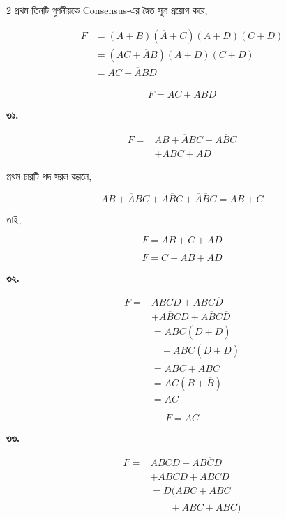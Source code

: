 \begin{multicols}{2}
প্রথম তিনটি গুণনীয়কে
\textenglish{Consensus}-এর দ্বৈত সূত্র প্রয়োগ করে,

\[
\begin{aligned}
F
&=(A+B)(\overline A+C)(A+D)(C+D)\\
&=(AC+\overline AB)(A+D)(C+D)\\
&=AC+\overline ABD
\end{aligned}
\]

\[
\boxed{F=AC+\overline ABD}
\]

\medskip


\textbf{৩১.}

\[
\begin{aligned}
F
={}&AB+\overline ABC+A\overline BC\\
&+\overline A\overline BC+AD
\end{aligned}
\]

প্রথম চারটি পদ সরল করলে,

\[
AB+\overline ABC
+A\overline BC+\overline A\overline BC
=
AB+C
\]

তাই,

\[
F=AB+C+AD
\]

\[
\boxed{F=C+AB+AD}
\]

\medskip


\textbf{৩২.}

\[
\begin{aligned}
F
={}&ABCD+ABC\overline D\\
&+A\overline BCD+A\overline BC\overline D\\
&=ABC(D+\overline D)\\
&\quad+A\overline BC(D+\overline D)\\
&=ABC+A\overline BC\\
&=AC(B+\overline B)\\
&=AC
\end{aligned}
\]

\[
\boxed{F=AC}
\]

\medskip


\textbf{৩৩.}

\[
\begin{aligned}
F
={}&ABCD+AB\overline CD\\
&+A\overline BCD+\overline ABCD\\
&=D(ABC+AB\overline C\\
&\qquad+A\overline BC+\overline ABC)
\end{aligned}
\]


\end{multicols}

